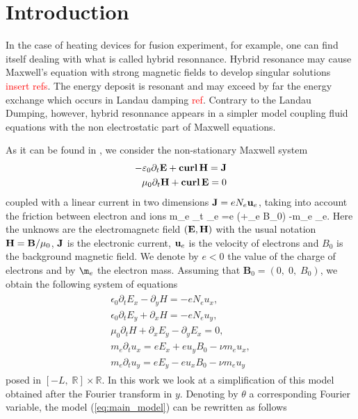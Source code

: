 \section{Introduction}
In the case of heating devices for fusion experiment, for example, 
one can find itself dealing with what is called hybrid resonnance. 
Hybrid resonance may cause Maxwell's equation with strong magnetic 
fields to develop singular solutions \textcolor{red}{insert refs}. 
The energy deposit is resonant and may exceed by far the energy 
exchange which occurs in Landau damping \textcolor{red}{ref}. 
Contrary to the Landau Dumping, however, 
hybrid resonnance appears in a simpler model coupling 
fluid equations with the non electrostatic part of Maxwell equations.


As it can be found in \cite{stable_yee_plasma_current}, we consider the non-stationary Maxwell system  
\begin{align}
-\varepsilon_0 \partial_t {\bf E} + {\bf curl}\, {\bf H} = {\bf J}\\
\mu_0 \partial_t {\bf H} + {\bf curl}\, {\bf E} = 0
\end{align}
coupled with a linear current in two dimensions ${\bf J} = eN_e {\bf u}_e$, taking into account the friction between electron and ions
\be
m_e \partial_t \ubf_e =e (\E +\ubf_e \nabla B_0) -m_e \nu \ubf_e. \label{eq:electronmove}
\ee
Here the unknows are the electromagnetc field $({\bf E},{\bf H})$ with the usual notation ${\bf H} = {\bf B}/\mu_0$, ${\bf J}$ is the electronic current, 
${\bf u}_e$ is the velocity of electrons and $B_0$ is the background magnetic field.  
We denote by $e<0$ the value of the charge of electrons and by $\m_e$ the electron mass.
Assuming that $\mathbf{B}_0=\left(0,\; 0,\; B_0\right)$, we obtain the following system of equations 
\begin{align}
\label{eq:main_model}
\begin{split}
\epsilon_0\partial_t E_{x}-\partial_y H=-eN_e u_x,\nonumber\\
\epsilon_0\partial_t E_{y}+\partial_x H=-eN_e u_y,\nonumber\\
\mu_0\partial_t H+\partial_x E_y-\partial_y E_x=0,\\
m_e\partial_t u_x=eE_x+eu_yB_0-\nu m_e u_x,\nonumber\\
m_e\partial_t u_y=eE_y-eu_xB_0-\nu m_e u_y\nonumber
\end{split}
\end{align}
posed in $[-L,\; \mathbb{R}]\times \mathbb{R}$. 
In this work we look at a simplification of this model obtained after 
the Fourier transform in $y$. Denoting by $\theta$ a corresponding Fourier variable, the model (\ref{eq:main_model}) can be rewritten as follows
